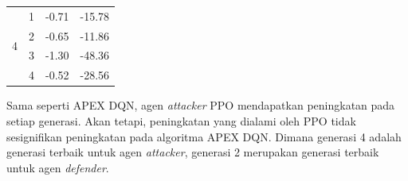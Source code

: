 \begin{table}[H]
\begin{tabular}{|c|c|c|c|}
  \multirow{4}{*}{4}                                                           & 1                                                                            & -0.71                                                                            & -15.78                                                                           \\ \cline{2-4} 
                                                                               & 2                                                                            & -0.65                                                                            & -11.86                                                                           \\ \cline{2-4} 
                                                                               & 3                                                                            & -1.30                                                                            & -48.36                                                                           \\ \cline{2-4} 
                                                                               & 4                                                                            & -0.52                                                                            & -28.56                                                                           \\ \hline
  \end{tabular}
\end{table}

Sama seperti APEX DQN, agen \emph{attacker} PPO mendapatkan peningkatan pada setiap generasi.
Akan tetapi, peningkatan yang dialami oleh PPO tidak sesignifikan peningkatan pada algoritma APEX DQN.
Dimana generasi 4 adalah generasi terbaik untuk agen \emph{attacker}, generasi 2 merupakan generasi terbaik untuk agen \emph{defender}.

